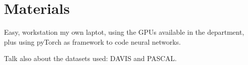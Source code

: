 
%
\newpage
\chapter{Materials}


Easy, workstation my own laptot, using the GPUs available in the department, plus using pyTorch as framework to code neural networks.

Talk also about the datasets used: DAVIS and PASCAL.

